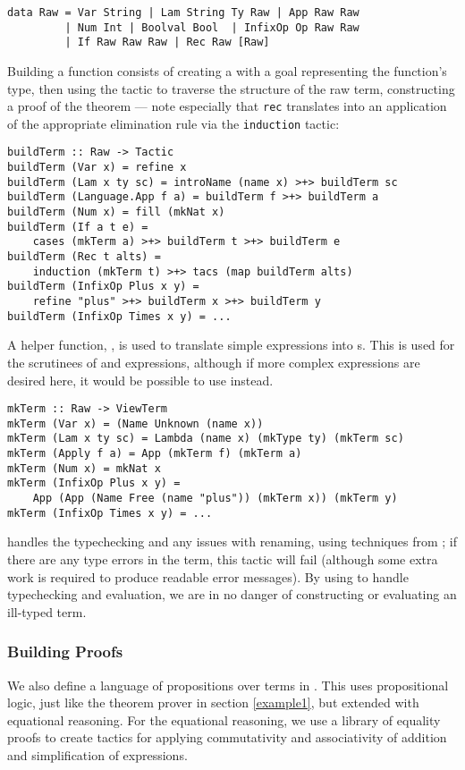 \begin{verbatim}
data Raw = Var String | Lam String Ty Raw | App Raw Raw
         | Num Int | Boolval Bool  | InfixOp Op Raw Raw
         | If Raw Raw Raw | Rec Raw [Raw]
\end{verbatim}

Building a \Funl{} function consists of creating a 
with a goal representing the function's type, then using the
 tactic to traverse the
structure of the raw term, constructing a proof of the
theorem --- note especially that \texttt{rec} translates into an
application of the appropriate elimination rule via the
\texttt{induction} tactic:

\begin{verbatim}
buildTerm :: Raw -> Tactic
buildTerm (Var x) = refine x
buildTerm (Lam x ty sc) = introName (name x) >+> buildTerm sc
buildTerm (Language.App f a) = buildTerm f >+> buildTerm a
buildTerm (Num x) = fill (mkNat x)
buildTerm (If a t e) =
    cases (mkTerm a) >+> buildTerm t >+> buildTerm e
buildTerm (Rec t alts) =
    induction (mkTerm t) >+> tacs (map buildTerm alts)
buildTerm (InfixOp Plus x y) =
    refine "plus" >+> buildTerm x >+> buildTerm y
buildTerm (InfixOp Times x y) = ...
\end{verbatim}

A helper function, , is used to translate simple
expressions into s. This is used for the scrutinees of
 and  expressions, although if more complex
expressions are desired here, it would be possible to use
 instead.

\begin{verbatim}
mkTerm :: Raw -> ViewTerm
mkTerm (Var x) = (Name Unknown (name x))
mkTerm (Lam x ty sc) = Lambda (name x) (mkType ty) (mkTerm sc)
mkTerm (Apply f a) = App (mkTerm f) (mkTerm a)
mkTerm (Num x) = mkNat x
mkTerm (InfixOp Plus x y) =
    App (App (Name Free (name "plus")) (mkTerm x)) (mkTerm y)
mkTerm (InfixOp Times x y) = ...
\end{verbatim}

\Ivor{} handles
the typechecking and any issues with renaming, using techniques from
\cite{not-a-number}; if there are any type errors in the 
term, this tactic will fail (although some extra work is required to
produce readable error messages). By using \Ivor{} to handle
typechecking and evaluation, we are in no danger of constructing or
evaluating an ill-typed term.


\subsubsection{Building Proofs}
We also define a language of propositions over terms in \Funl{}.
This uses propositional logic, just like the theorem prover in
section \ref{example1}, but extended with equational reasoning. For
the equational reasoning, we use a library of equality proofs to
create tactics for applying commutativity and associativity of
addition and simplification of expressions.

